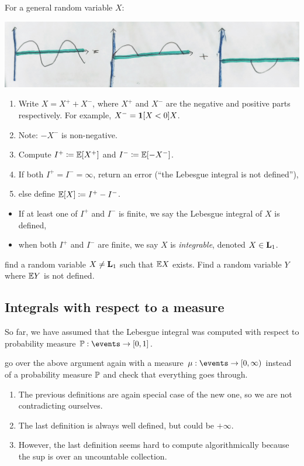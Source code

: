 \documentclass{article}
\begin{document}
For a general random variable $X$:
\begin{center}
	\includegraphics[width=0.8\linewidth]{figures/decomposition}
\end{center} 
\begin{enumerate}
  \item Write $X = X^{+} + X^{-}$, where $X^{+}$ and $X^{-}$ are the negative and positive parts respectively. For example, $X^{-} = \1[X < 0] X$. 
  \item Note: $-X^{-}$ is non-negative.
  \item Compute $I^{+} \defeq \E[X^+]$ and $I^{-} \defeq \E[-X^-]$.
  \item If both $I^{+} = I^- = \infty$, return an error (``the Lebesgue integral is not defined''),
  \item else define $\E[X] \defeq I^{+} - I^{-}$.
\end{enumerate}

\begin{itemize} 
  \item If at least one of $I^{+}$ and $I^-$ is finite, we say the Lebesgue integral of $X$ is defined,
  \item when both $I^{+}$ and $I^-$ are finite, we say $X$ is \emph{integrable}, denoted $X \in \L_1$. 
\end{itemize}

 find a random variable $X \neq \L_1$ such that $\E X$ exists. Find a random variable $Y$ where $\E Y$ is not defined. 


\subsection{Integrals with respect to a measure}

So far, we have assumed that the Lebesgue integral was computed with respect to probability measure $\P : \events \to [0, 1]$. 

 go over the above argument again with a measure $\mu : \events \to [0, \infty)$ instead of a probability measure $\P$ and check that everything goes through.

\begin{enumerate}
  \item The previous definitions are again special case of the new one, so we are not contradicting ourselves.
  \item The last definition is always well defined, but could be $+\infty$.
  \item However, the last definition seems hard to compute algorithmically because the sup is over an uncountable collection.
\end{enumerate}
\end{document}
